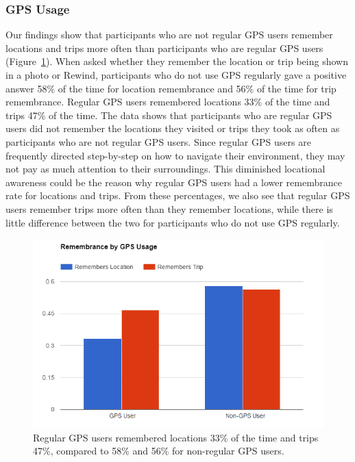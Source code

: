 \documentclass{sigchi}
\begin{document}
\subsubsection{GPS Usage}
Our findings show that participants who are not regular GPS users remember locations and trips more often than participants who are regular GPS users (Figure~\ref{fig:gpsmemory}). When asked whether they remember the location or trip being shown in a photo or Rewind, participants who do not use GPS regularly gave a positive answer 58\% of the time for location remembrance and 56\% of the time for trip remembrance. Regular GPS users remembered locations 33\% of the time and trips 47\% of the time. The data shows that participants who are regular GPS users did not remember the locations they visited or trips they took as often as participants who are not regular GPS users. Since regular GPS users are frequently directed step-by-step on how to navigate their environment, they may not pay as much attention to their surroundings. This diminished locational awareness could be the reason why regular GPS users had a lower remembrance rate for locations and trips. From these percentages, we also see that regular GPS users remember trips more often than they remember locations, while there is little difference between the two for participants who do not use GPS regularly. 

\begin{figure}
	\centering
	\includegraphics[width=1\linewidth]{GPS_remembrance_2}
	\caption{Regular GPS users remembered locations 33\% of the time and trips 47\%, compared to 58\% and 56\% for non-regular GPS users.}
	\label{fig:gpsmemory}
\end{figure}
\end{document}
